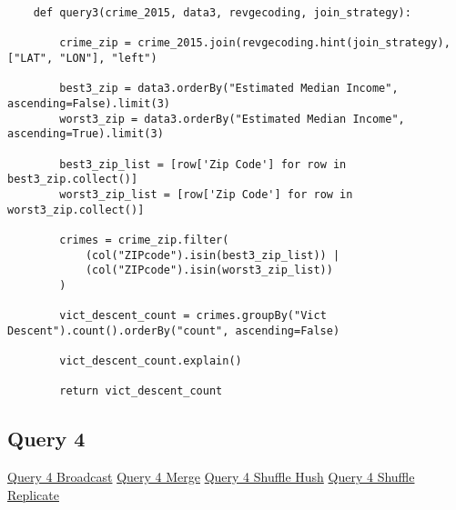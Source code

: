 \documentclass{article}
\begin{document}
\begin{lstlisting}
    def query3(crime_2015, data3, revgecoding, join_strategy):

        crime_zip = crime_2015.join(revgecoding.hint(join_strategy), ["LAT", "LON"], "left")

        best3_zip = data3.orderBy("Estimated Median Income", ascending=False).limit(3)
        worst3_zip = data3.orderBy("Estimated Median Income", ascending=True).limit(3)

        best3_zip_list = [row['Zip Code'] for row in best3_zip.collect()]
        worst3_zip_list = [row['Zip Code'] for row in worst3_zip.collect()]

        crimes = crime_zip.filter(
            (col("ZIPcode").isin(best3_zip_list)) |
            (col("ZIPcode").isin(worst3_zip_list))
        )

        vict_descent_count = crimes.groupBy("Vict Descent").count().orderBy("count", ascending=False)

        vict_descent_count.explain()

        return vict_descent_count
\end{lstlisting}


\subsection*{Query 4}

\href{http://83.212.81.191:18080/history/application_1705357398960_0019/jobs/} {Query 4 Broadcast}
\href{http://83.212.81.191:18080/history/application_1705357398960_0020/jobs/} {Query 4 Merge}
\href{http://83.212.81.191:18080/history/application_1705357398960_0021/jobs/} {Query 4 Shuffle Hush}
\href{http://83.212.81.191:18080/history/application_1705357398960_0023/jobs/} {Query 4 Shuffle Replicate} \\
\end{document}
